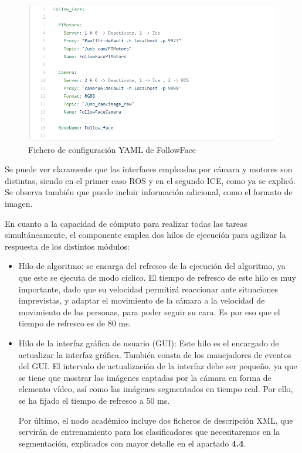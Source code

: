 \begin{figure}[H]
  \begin{center}
    \includegraphics[width=0.99\linewidth]{figures/ymlfollowface.png}
		\caption{Fichero de configuración YAML de FollowFace}
		\label{fig.followfaceconf}
		\end{center}
\end{figure}

Se puede ver claramente que las interfaces empleadas por cámara y motores son distintas, siendo en el primer caso ROS y en el segundo ICE, como ya se explicó. Se observa también que puede incluir información adicional, como el formato de imagen.

En cuanto a la capacidad de cómputo para realizar todas las tareas simultáneamente, el componente emplea dos hilos de ejecución para agilizar la respuesta de los distintos módulos:
\begin{itemize}
	\renewcommand{\labelitemi}{$\to$}
	\item Hilo de algoritmo: se encarga del refresco de la ejecución del algoritmo, ya que este se ejecuta de modo cíclico. El tiempo de refresco de este hilo es muy importante, dado que su velocidad permitirá reaccionar ante situaciones imprevistas, y adaptar el movimiento de la cámara a la velocidad de movimiento de las personas, para poder seguir su cara. Es por eso que el tiempo de refresco es de 80 ms.
	\item Hilo de la interfaz gráfica de usuario (GUI): Este hilo es el encargado de actualizar la interfaz gráfica. También consta de los manejadores de eventos del GUI. El intervalo de actualización de la interfaz debe ser pequeño, ya que se tiene que mostrar las imágenes captadas por la cámara en forma de elemento vídeo, así como las imágenes segmentados en tiempo real. Por ello, se ha fijado el tiempo de refresco a 50 ms.
	
	Por último, el nodo académico incluye dos ficheros de descripción XML, que servirán de entrenamiento para los clasificadores que necesitaremos en la segmentación, explicados con mayor detalle en el apartado \textbf{4.4}. 
\end{itemize}


